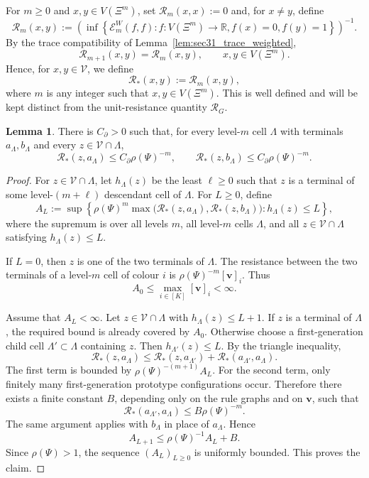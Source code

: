 \documentclass{article}
\theoremstyle{plain}
\theoremstyle{definition}
\newtheorem{lemma}[theorem]{Lemma}
\newcommand{\Reff}{\mathscr{R}}
\begin{document}
For $m\ge 0$ and $x,y\in V(\Xi^m)$, set $\Reff_m(x,x):=0$ and, for $x\ne y$, define
\[
\Reff_m(x,y)
:=
\left(
\inf\left\{
\mathcal E_m^W(f,f):
 f:V(\Xi^m)\to\mathbb R,
 f(x)=0,
 f(y)=1
\right\}
\right)^{-1}.
\]
By the trace compatibility of Lemma~\ref{lem:sec31_trace_weighted},
\[
\Reff_{m+1}(x,y)=\Reff_m(x,y),
\qquad x,y\in V(\Xi^m).
\]
Hence, for $x,y\in\mathscr V$, we define
\[
\Reff_*(x,y):=\Reff_m(x,y),
\]
where $m$ is any integer such that $x,y\in V(\Xi^m)$.
This is well defined and will be kept distinct from the unit-resistance quantity $\Reff_G$.

\begin{lemma}\label{lem:sec32_point_boundary}
There is $C_\partial>0$ such that, for every level-$m$ cell $\Lambda$ with terminals $a_{\Lambda},b_{\Lambda}$ and every $z\in\mathscr V\cap\Lambda$,
\[
\Reff_*(z,a_{\Lambda})\le C_\partial\rho(\Psi)^{-m},
\qquad
\Reff_*(z,b_{\Lambda})\le C_\partial\rho(\Psi)^{-m}.
\]
\end{lemma}

\begin{proof}
For $z\in\mathscr V\cap\Lambda$, let $h_{\Lambda}(z)$ be the least $\ell\ge 0$ such that $z$ is a terminal of some level-$(m+\ell)$ descendant cell of $\Lambda$.
For $L\ge 0$, define
\[
A_L:=
\sup
\left\{
\rho(\Psi)^m
\max\bigl(
\Reff_*(z,a_{\Lambda}),
\Reff_*(z,b_{\Lambda})
\bigr):
 h_{\Lambda}(z)\le L
\right\},
\]
where the supremum is over all levels $m$, all level-$m$ cells $\Lambda$, and all $z\in\mathscr V\cap\Lambda$ satisfying $h_{\Lambda}(z)\le L$.

If $L=0$, then $z$ is one of the two terminals of $\Lambda$.
The resistance between the two terminals of a level-$m$ cell of colour $i$ is $\rho(\Psi)^{-m}[\mathbf v]_i$.
Thus
\[
A_0\le \max_{i\in[K]}[\mathbf v]_i<\infty.
\]

Assume that $A_L<\infty$.
Let $z\in\mathscr V\cap\Lambda$ with $h_{\Lambda}(z)\le L+1$.
If $z$ is a terminal of $\Lambda$, the required bound is already covered by $A_0$.
Otherwise choose a first-generation child cell $\Lambda'\subset\Lambda$ containing $z$.
Then $h_{\Lambda'}(z)\le L$.
By the triangle inequality,
\[
\Reff_*(z,a_{\Lambda})
\le
\Reff_*(z,a_{\Lambda'})
+
\Reff_*(a_{\Lambda'},a_{\Lambda}).
\]
The first term is bounded by $\rho(\Psi)^{-(m+1)}A_L$.
For the second term, only finitely many first-generation prototype configurations occur.
Therefore there exists a finite constant $B$, depending only on the rule graphs and on $\mathbf v$, such that
\[
\Reff_*(a_{\Lambda'},a_{\Lambda})\le B\rho(\Psi)^{-m}.
\]
The same argument applies with $b_{\Lambda}$ in place of $a_{\Lambda}$.
Hence
\[
A_{L+1}\le \rho(\Psi)^{-1}A_L+B.
\]
Since $\rho(\Psi)>1$, the sequence $(A_L)_{L\ge 0}$ is uniformly bounded.
This proves the claim.
\end{proof}
\end{document}
